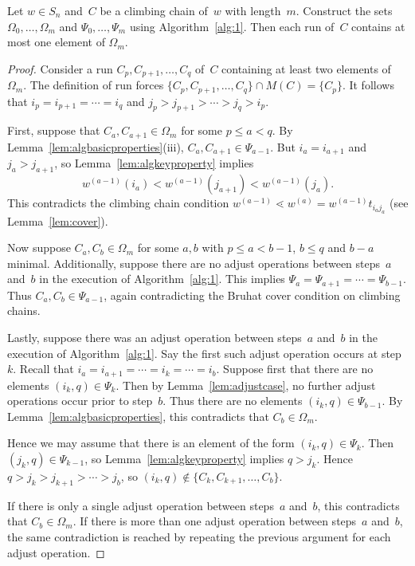 \documentclass[ALCO]{cedram}
\begin{document}
\begin{lemma}
	\label{lem:atmostoneperrun}
	Let $w\in S_n$ and~$C$ be a climbing chain of~$w$ with length~$m$. Construct the sets $\Omega_0,\ldots,\Omega_m$ and $\Psi_0,\ldots,\Psi_m$ using Algorithm~\ref{alg:1}. Then each run of~$C$ contains at most one element of $\Omega_m$.
\end{lemma}
\begin{proof}
	Consider a run $C_{p},C_{p+1},\ldots,C_{q}$ of~$C$ containing at least two elements of $\Omega_m$. The definition of run forces $\{C_p,C_{p+1},\ldots,C_q\}\cap M(C) = \{C_p\}$. It follows that $i_p=i_{p+1}=\cdots=i_{q}$ and $j_p>j_{p+1}>\cdots>j_q>i_p$. 
	
	First, suppose that $C_a,C_{a+1}\in \Omega_m$ for some $p\leq a< q$. By Lemma~\ref{lem:algbasicproperties}(iii), $C_a,C_{a+1}\in \Psi_{a-1}$. But $i_a=i_{a+1}$ and $j_a>j_{a+1}$, so Lemma~\ref{lem:algkeyproperty} implies
	\[w^{(a-1)}(i_a) < w^{(a-1)}(j_{a+1}) < w^{(a-1)}(j_a). \]
	This contradicts the climbing chain condition $w^{(a-1)}\lessdot w^{(a)} = w^{(a-1)}t_{i_aj_a}$ (see Lemma~\ref{lem:cover}).
	
	Now suppose $C_a,C_b\in \Omega_m$ for some $a,b$ with $p\leq a<b-1$, $b\leq q$ and $b-a$ minimal. Additionally, suppose there are no adjust operations between steps~$a$ and~$b$ in the execution of Algorithm~\ref{alg:1}. This implies $\Psi_a=\Psi_{a+1}=\cdots=\Psi_{b-1}$. Thus $C_a,C_b\in \Psi_{a-1}$, again contradicting the Bruhat cover condition on climbing chains.
	
	Lastly, suppose there was an adjust operation between steps~$a$ and~$b$ in the execution of Algorithm~\ref{alg:1}. Say the first such adjust operation occurs at step~$k$. Recall that $i_a=i_{a+1}=\cdots=i_k=\cdots=i_b$. Suppose first that there are no elements $(i_k,q)\in \Psi_{k}$. Then by Lemma~\ref{lem:adjustcase}, no further adjust operations occur prior to step~$b$. Thus there are no elements $(i_k,q)\in \Psi_{b-1}$. By Lemma~\ref{lem:algbasicproperties}, this contradicts that $C_b\in \Omega_m$.
	
	Hence we may assume that there is an element of the form $(i_k,q)\in \Psi_k$. Then $(j_k,q)\in \Psi_{k-1}$, so Lemma~\ref{lem:algkeyproperty} implies $q>j_k$. Hence $q>j_k>j_{k+1}>\cdots>j_b$, so $(i_k,q)\notin \{C_k,C_{k+1},\ldots,C_{b}\}$. 
	
	If there is only a single adjust operation between steps~$a$ and~$b$, this contradicts that $C_b\in \Omega_m$. If there is more than one adjust operation between steps~$a$ and~$b$, the same contradiction is reached by repeating the previous argument for each adjust operation. 
\end{proof}
\end{document}
